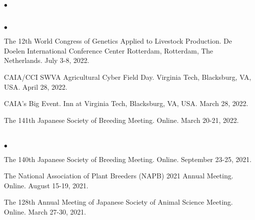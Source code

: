 \documentclass[margin,line,10pt]{res}
\newenvironment{list2}{
  \begin{list}{$\bullet$}{%
      \setlength{\itemsep}{0in}
      \setlength{\parsep}{0in} \setlength{\parskip}{0in}
      \setlength{\topsep}{0in} \setlength{\partopsep}{0in} 
      \setlength{\leftmargin}{0.2in}}}{\end{list}}
\begin{document}
\begin{resume}
\begin{list2}
\end{list2}

\section{}
\begin{list2}

\item   The 12th World Congress of Genetics Applied to Livestock Production. De Doelen International Conference Center Rotterdam, Rotterdam, The Netherlands. July 3-8, 2022.

    \vspace{0.5cm}

    
  \item  CAIA/CCI SWVA Agricultural Cyber Field Day. Virginia Tech, Blacksburg, VA, USA. April 28, 2022.

       
  \vspace{0.5cm}

\item  CAIA's Big Event. Inn at Virginia Tech, Blacksburg, VA, USA. March 28, 2022.

       
  \vspace{0.5cm}
  
\item The 141th Japanese Society of Breeding Meeting. Online. March 20-21, 2022. 
  
\end{list2}


\section{}
\begin{list2}

 
  
\item The 140th Japanese Society of Breeding Meeting. Online. September 23-25, 2021. 

   \vspace{0.5cm}

   \item  The National Association of Plant Breeders (NAPB) 2021 Annual Meeting. Online. August 15-19, 2021. 
  
     \vspace{0.5cm}

\item  The 128th Annual Meeting of Japanese Society of Animal Science Meeting. Online. March 27-30, 2021. 
  

\end{list2}
\end{resume}
\end{document}
